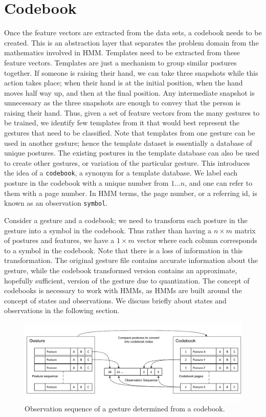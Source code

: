 \documentclass[]{report}   %
\begin{document}
\section{Codebook}
Once the feature vectors are extracted from the data sets, a codebook needs to be created. This is an abstraction layer that separates the problem domain from the mathematics involved in HMM. Templates need to be extracted from these feature vectors. Templates are just a mechanism to group similar postures together. If someone is raising their hand, we can take three snapshots while this action takes place; when their hand is at the initial position, when the hand moves half way up, and then at the final position. Any intermediate snapshot is unnecessary as the three snapshots are enough to convey that the person is raising their hand. Thus, given a set of feature vectors from the many gestures to be trained, we identify few templates from it that would best represent the gestures that need to be classified. Note that templates from one gesture can be used in another gesture; hence the template dataset is essentially a database of unique postures. The existing postures in the template database can also be used to create other gestures, or variation of the particular gesture. This introduces the idea of a \texttt{codebook}, a synonym for a template database. We label each posture in the codebook with a unique number from $1\ldots n$, and one can refer to them with a page number. In HMM terms, the page number, or a referring id, is known as an observation \texttt{symbol}.

Consider a gesture and a codebook; we need to transform each posture in the gesture into a symbol in the codebook. Thus rather than having a $n\times m$ matrix of postures and features, we have a $1\times m$ vector where each column corresponds to a symbol in the codebook. Note that there is a loss of information in this transformation. The original gesture file contains accurate information about the gesture, while the codebook transformed version contains an approximate, hopefully sufficient, version of the gesture due to quantization. The concept of codebooks is necessary to work with HMMs, as HMMs are built around the concept of states and observations. We discuss briefly about states and observations in the following section. 

\begin{figure}[htbp]
	\centering
		\includegraphics[width=1.0\textwidth]{fw2.pdf}
	\caption{Observation sequence of a gesture determined from a codebook.}
	\label{fig:fw2}
\end{figure}
\end{document}
